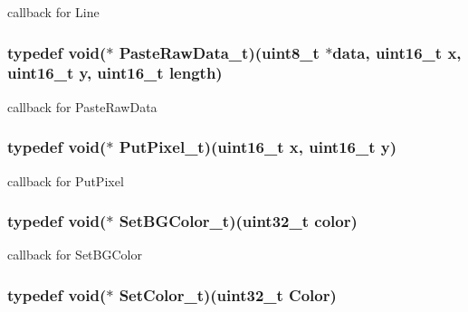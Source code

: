 callback for Line \hypertarget{group__graphic__hw__interface_g23f1f3d777d2fee79309669dcd30cdac}{
\subsubsection[{PasteRawData\_\-t}]{\setlength{\rightskip}{0pt plus 5cm}typedef void($\ast$ {\bf PasteRawData\_\-t})(uint8\_\-t $\ast$data, uint16\_\-t x, uint16\_\-t y, uint16\_\-t length)}}
\label{group__graphic__hw__interface_g23f1f3d777d2fee79309669dcd30cdac}


callback for PasteRawData \hypertarget{group__graphic__hw__interface_gd4fdf6d87a3b08492ea381f7bbc3922f}{
\subsubsection[{PutPixel\_\-t}]{\setlength{\rightskip}{0pt plus 5cm}typedef void($\ast$ {\bf PutPixel\_\-t})(uint16\_\-t x, uint16\_\-t y)}}
\label{group__graphic__hw__interface_gd4fdf6d87a3b08492ea381f7bbc3922f}


callback for PutPixel \hypertarget{group__graphic__hw__interface_g7373056a36a75da73dc4921dd10074fa}{
\subsubsection[{SetBGColor\_\-t}]{\setlength{\rightskip}{0pt plus 5cm}typedef void($\ast$ {\bf SetBGColor\_\-t})(uint32\_\-t color)}}
\label{group__graphic__hw__interface_g7373056a36a75da73dc4921dd10074fa}


callback for SetBGColor \hypertarget{group__graphic__hw__interface_ge9372db6223f46e25c072f5d97b4223f}{
\subsubsection[{SetColor\_\-t}]{\setlength{\rightskip}{0pt plus 5cm}typedef void($\ast$ {\bf SetColor\_\-t})(uint32\_\-t Color)}}
\label{group__graphic__hw__interface_ge9372db6223f46e25c072f5d97b4223f}


